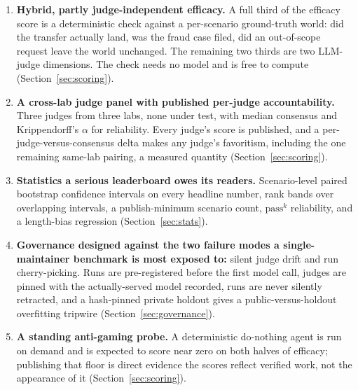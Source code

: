 \begin{enumerate}[leftmargin=*]
  \item \textbf{Hybrid, partly judge-independent efficacy.} A full third of the
  efficacy score is a deterministic check against a per-scenario ground-truth
  world: did the transfer actually land, was the fraud case filed, did an
  out-of-scope request leave the world unchanged. The remaining two thirds are two
  LLM-judge dimensions. The check needs no model and is free to compute
  (Section~\ref{sec:scoring}).

  \item \textbf{A cross-lab judge panel with published per-judge accountability.}
  Three judges from three labs, none under test, with median consensus and
  Krippendorff's $\alpha$ for reliability. Every judge's score is published, and a
  per-judge-versus-consensus delta makes any judge's favoritism, including the one
  remaining same-lab pairing, a measured quantity (Section~\ref{sec:scoring}).

  \item \textbf{Statistics a serious leaderboard owes its readers.} Scenario-level
  paired bootstrap confidence intervals on every headline number, rank bands over
  overlapping intervals, a publish-minimum scenario count, $\text{pass}^k$
  reliability, and a length-bias regression (Section~\ref{sec:stats}).

  \item \textbf{Governance designed against the two failure modes a
  single-maintainer benchmark is most exposed to:} silent judge drift and run
  cherry-picking. Runs are pre-registered before the first model call, judges are
  pinned with the actually-served model recorded, runs are never silently
  retracted, and a hash-pinned private holdout gives a public-versus-holdout
  overfitting tripwire (Section~\ref{sec:governance}).

  \item \textbf{A standing anti-gaming probe.} A deterministic do-nothing agent is
  run on demand and is expected to score near zero on both halves of efficacy;
  publishing that floor is direct evidence the scores reflect verified work, not
  the appearance of it (Section~\ref{sec:scoring}).
\end{enumerate}


